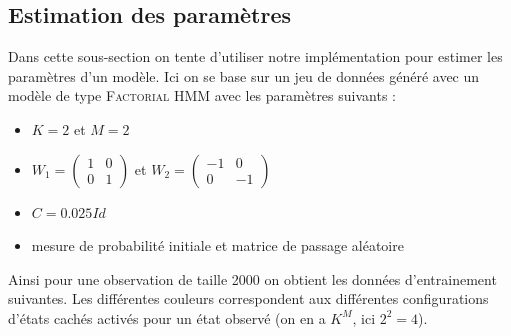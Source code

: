 \documentclass[10pt,a4paper]{article}
\newcommand{\fhmm}{\textsc{Factorial HMM}}
\begin{document}
 \subsection{Estimation des paramètres}
 Dans cette sous-section on tente d'utiliser notre implémentation pour estimer les paramètres d'un modèle. Ici on se base sur un jeu de données généré avec un modèle de type \fhmm{} avec les paramètres suivants :
 \begin{itemize}
 \item $K=2$ et $M=2$
 \item $W_1 = \left( \begin{matrix}
 1 & 0 \\
 0 & 1
 \end{matrix} \right)$ et $W_2 = \left( \begin{matrix}
 -1 & 0 \\
 0 & -1
 \end{matrix} \right)$
 \item $C=0.025 Id$
 \item mesure de probabilité initiale et matrice de passage aléatoire
 \end{itemize}
 Ainsi pour une observation de taille 2000 on obtient les données d'entrainement suivantes. Les différentes couleurs correspondent aux différentes configurations d'états cachés activés pour un 
 état observé (on en a $K^M$, ici $2^2=4$).\label{data}
\end{document}
